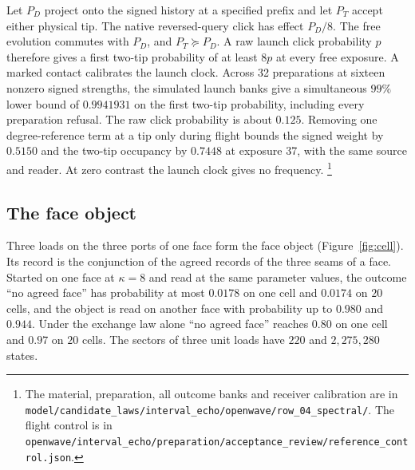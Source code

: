 \documentclass[11pt]{article}
\theoremstyle{definition}
\theoremstyle{remark}
\theoremstyle{plain}
\begin{document}
Let \(P_D\) project onto the signed history at a specified prefix and
let \(P_T\) accept either physical tip. The native reversed-query click
has effect \(P_D/8\). The free evolution commutes with \(P_D\), and
\(P_T\succeq P_D\). A raw launch click probability \(p\) therefore gives
a first two-tip probability of at least \(8p\) at every free exposure.
A marked contact calibrates the launch clock. Across 32 preparations
at sixteen nonzero signed strengths, the simulated launch banks
give a simultaneous \(99\%\) lower bound of \(0.9941931\) on the first
two-tip probability, including every preparation refusal. The raw
click probability is about \(0.125\). Removing one degree-reference
term at a tip only during flight bounds the signed weight by \(0.5150\)
and the two-tip occupancy by \(0.7448\) at exposure 37, with the same
source and reader. At zero contrast the launch clock gives no
frequency.%
\footnote{The material, preparation, all outcome banks and receiver
calibration are in
\nolinkurl{model/candidate_laws/interval_echo/openwave/row_04_spectral/}.
The flight control is in
\nolinkurl{openwave/interval_echo/preparation/acceptance_review/reference_control.json}.}

\subsection{The face object}

Three loads on the three ports of one face form the face object
(Figure~\ref{fig:cell}). Its record is the conjunction of the agreed
records of the three seams of a face. Started on one face at $\kappa=8$ and
read at the same parameter values, the outcome ``no agreed face'' has
probability at most $0.0178$ on one cell and $0.0174$ on $20$ cells, and
the object is read on another face with probability up to $0.980$ and
$0.944$. Under the exchange law alone ``no agreed face'' reaches $0.80$ on
one cell and $0.97$ on $20$ cells. The sectors of three unit loads have
$220$ and $2{,}275{,}280$ states.
\end{document}

